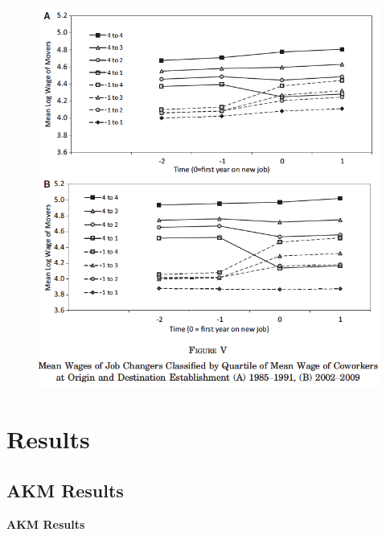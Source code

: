 \documentclass[notes=show]{beamer}
\begin{document}
\begin{frame}
\begin{figure}[p!]
	\begin{adjustbox}
 \includegraphics[width=.75\textwidth]{figures/Fig5} 
 	\end{adjustbox}
\end{figure}
\end{frame}

\section{Results}

\subsection*{AKM Results}

\begin{frame}
	\centering
	\textbf{AKM Results}
\end{frame}
\end{document}
